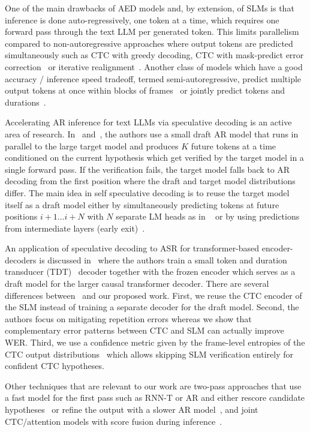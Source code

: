 \documentclass[cameraready]{Interspeech}
\begin{document}
One of the main drawbacks of AED models and, by extension, of SLMs is that inference is done auto-regressively, one token at a time, which requires one forward pass through the text LLM per generated token. This limits parallelism compared to non-autoregressive approaches where output tokens are predicted simultaneously such as CTC with greedy decoding, CTC with mask-predict error correction~\cite{higuchi2020mask} or iterative realignment~\cite{chi2021align}. Another class of models which have a good accuracy / inference speed tradeoff, termed semi-autoregressive, predict multiple output tokens at once within blocks of frames~\cite{arora2024semi} or jointly predict tokens and durations~\cite{xu2023efficient}. 

Accelerating AR inference for text LLMs via speculative decoding is an active area of research. In~\cite{leviathan2023fast} and~\cite{chen2023accelerating}, the authors use a small draft AR model that runs in parallel to the large target model and produces $K$ future tokens at a time conditioned on the current hypothesis which get verified by the target model in a single forward pass. If the verification fails, the target model falls back to AR decoding from the first position where the draft and target model distributions differ. The main idea in self speculative decoding is to reuse the target model itself as a draft model either by simultaneously predicting tokens at future positions $i+1\ldots i+N$ with $N$ separate LM heads as in ~\cite{cai2024medusa} or by using predictions from intermediate layers (early exit)~\cite{zhang2024draft}. 

An application of speculative decoding to ASR for transformer-based encoder-decoders is discussed in~\cite{lim2025hybrid} where the authors train a small token and duration transducer (TDT)~\cite{xu2023efficient} decoder together with the frozen encoder which serves as a draft model for the larger causal transformer decoder. There are several differences between~\cite{lim2025hybrid} and our proposed work. First, we reuse the CTC encoder of the SLM instead of training a separate decoder for the draft model. Second, the authors focus on mitigating repetition errors whereas we show that complementary error patterns between CTC and SLM can actually improve WER. Third, we use a confidence metric given by the frame-level entropies of the CTC output distributions~\cite{laptev2023fast} which allows skipping SLM verification entirely for confident CTC hypotheses.

Other techniques that are relevant to our work are two-pass approaches that use a fast model for the first pass such as RNN-T or AR and either rescore candidate hypotheses~\cite{sainath2019two} or refine the output with a slower AR model~\cite{hu2020deliberation}, and joint CTC/attention models with score fusion during inference~\cite{watanabe2017hybrid}. 
\end{document}
